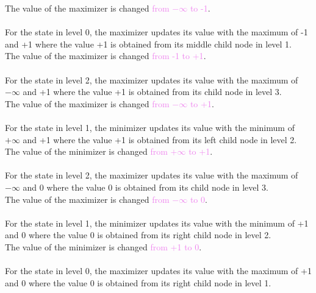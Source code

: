 \documentclass{book}
\begin{document}
The value of the maximizer is changed \textcolor{violet}{from $-\infty$ to -1}.\\
\vspace{3mm}
\\
For the state in level 0, the maximizer updates its value with the maximum of -1 and +1 where the value +1 is obtained from its middle child node in level 1.\\
The value of the maximizer is changed \textcolor{violet}{from -1 to +1}.\\
\vspace{3mm}
\\
For the state in level 2, the maximizer updates its value with the maximum of $-\infty$ and +1 where the value +1 is obtained from its child node in level 3.\\
The value of the maximizer is changed \textcolor{violet}{from $-\infty$ to +1}.\\
\vspace{3mm}
\\
For the state in level 1, the minimizer updates its value with the minimum of $+\infty$ and +1 where the value +1 is obtained from its left child node in level 2.\\
The value of the minimizer is changed \textcolor{violet}{from $+\infty$ to +1}.\\
\vspace{3mm}
\\
For the state in level 2, the maximizer updates its value with the maximum of $-\infty$ and 0 where the value 0 is obtained from its child node in level 3.\\
The value of the maximizer is changed \textcolor{violet}{from $-\infty$ to 0}.\\
\vspace{3mm}
\\
For the state in level 1, the minimizer updates its value with the minimum of +1 and 0 where the value 0 is obtained from its right child node in level 2.\\
The value of the minimizer is changed \textcolor{violet}{from +1 to 0}.\\
\vspace{3mm}
\\ 
For the state in level 0, the maximizer updates its value with the maximum of +1 and 0 where the value 0 is obtained from its right child node in level 1.\\
\end{document}
